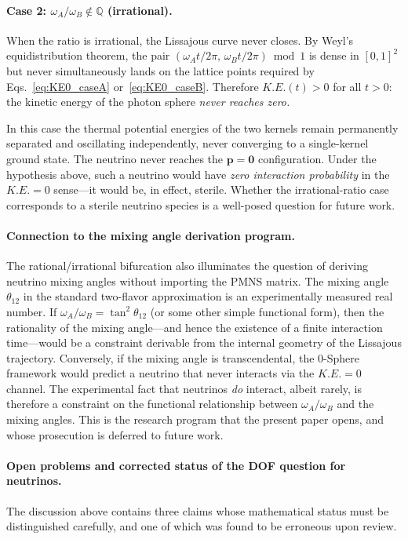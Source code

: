 \documentclass[%
 reprint, amsmath,amssymb, aps, prb, ]{revtex4-2}
\numberwithin{equation}{section}
\begin{document}
\paragraph{Case 2: $\omega_A/\omega_B \notin \mathbb{Q}$ (irrational).}
When the ratio is irrational, the Lissajous curve never closes. By Weyl's equidistribution theorem, the pair $(\omega_A t / 2\pi,\, \omega_B t / 2\pi) \bmod 1$ is dense in $[0,1]^2$ but never simultaneously lands on the lattice points required by Eqs.~\eqref{eq:KE0_caseA} or~\eqref{eq:KE0_caseB}. Therefore $K.E.(t) > 0$ for all $t > 0$: the kinetic energy of the photon sphere \emph{never reaches zero.}

In this case the thermal potential energies of the two kernels remain permanently separated and oscillating independently, never converging to a single-kernel ground state. The neutrino never reaches the $\mathbf{p} = \mathbf{0}$ configuration. Under the hypothesis above, such a neutrino would have \emph{zero interaction probability} in the $K.E. = 0$ sense---it would be, in effect, sterile. Whether the irrational-ratio case corresponds to a sterile neutrino species is a well-posed question for future work.

\paragraph{Connection to the mixing angle derivation program.}
The rational/irrational bifurcation also illuminates the question of deriving neutrino mixing angles without importing the PMNS matrix. The mixing angle $\theta_{12}$ in the standard two-flavor approximation is an experimentally measured real number. If $\omega_A/\omega_B = \tan^2\theta_{12}$ (or some other simple functional form), then the rationality of the mixing angle---and hence the existence of a finite interaction time---would be a constraint derivable from the internal geometry of the Lissajous trajectory. Conversely, if the mixing angle is transcendental, the 0-Sphere framework would predict a neutrino that never interacts via the $K.E. = 0$ channel. The experimental fact that neutrinos \emph{do} interact, albeit rarely, is therefore a constraint on the functional relationship between $\omega_A/\omega_B$ and the mixing angles. This is the research program that the present paper opens, and whose prosecution is deferred to future work.

\paragraph{Open problems and corrected status of the DOF question for neutrinos.}
The discussion above contains three claims whose mathematical status must be distinguished carefully, and one of which was found to be erroneous upon review.
\end{document}
